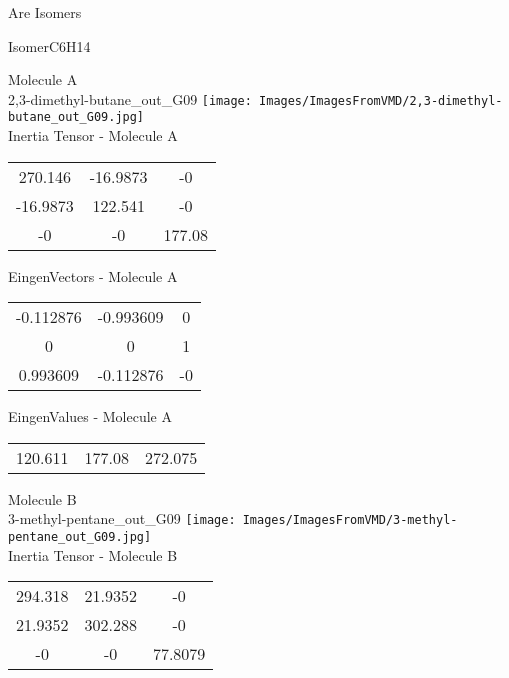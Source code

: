 \begin{center}
\vtab
\vtab
\textcolor{NavyBlue}{\Large Are Isomers}
\end{center}
\newpage

\vtab[-2cm]
\begin{center}
{\large IsomerC6H14}
\end{center}
\begin{multicols}{2}
\begin{center}
Molecule A \\ 
2,3-dimethyl-butane\_out\_G09
\texttt{[image: Images/ImagesFromVMD/2,3-dimethyl-butane\_out\_G09.jpg]}
\\
Inertia Tensor - Molecule A \\
\vtab
\begin{tabular}{|c c c|}
270.146	 & 	-16.9873	 & 	-0	 \\
-16.9873	 & 	122.541	 & 	-0	 \\
-0	 & 	-0	 & 	177.08
\end{tabular}

\vtab
 EingenVectors - Molecule A     \\
\vtab
\begin{tabular}{|c c c|}
-0.112876	 & 	-0.993609	 & 	0	 \\
0	 & 	0	 & 	1	 \\
0.993609	 & 	-0.112876	 & 	-0
\end{tabular}

\vtab
 EingenValues - Molecule A     \\
\vtab
\begin{tabular}{|c c c|}
120.611	 & 	177.08	 & 	272.075
\end{tabular}
\columnbreak

Molecule B \\ 
3-methyl-pentane\_out\_G09
\texttt{[image: Images/ImagesFromVMD/3-methyl-pentane\_out\_G09.jpg]}
\\
Inertia Tensor - Molecule B \\
\vtab
\begin{tabular}{|c c c|}
294.318	 & 	21.9352	 & 	-0	 \\
21.9352	 & 	302.288	 & 	-0	 \\
-0	 & 	-0	 & 	77.8079
\end{tabular}


\end{center}
\end{multicols}
